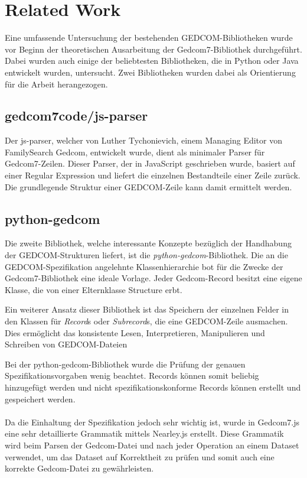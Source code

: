\chapter{Related Work}
\label{chap: Related Work}
Eine umfassende Untersuchung der bestehenden GEDCOM-Bibliotheken wurde vor Beginn der theoretischen Ausarbeitung der Gedcom7-Bibliothek durchgeführt. 
Dabei wurden auch einige der beliebtesten Bibliotheken, die in Python oder Java entwickelt wurden, untersucht. Zwei Bibliotheken wurden dabei als Orientierung 
für die Arbeit herangezogen.

\section{gedcom7code/js-parser}

Der js-parser, welcher von Luther Tychonievich, einem Managing Editor von FamilySearch Gedcom, entwickelt wurde, dient als minimaler Parser für Gedcom7-Zeilen. 
Dieser Parser, der in JavaScript geschrieben wurde, basiert auf einer Regular Expression und liefert die einzelnen Bestandteile einer Zeile zurück. Die grundlegende 
Struktur einer GEDCOM-Zeile kann damit ermittelt werden.

\section{python-gedcom}

Die zweite Bibliothek, welche interessante Konzepte bezüglich der Handhabung der GEDCOM-Strukturen liefert, ist die \textit{python-gedcom}-Bibliothek. 
Die an die GEDCOM-Spezifikation angelehnte Klassenhierarchie bot für die Zwecke der Gedcom7-Bibliothek eine ideale Vorlage. Jeder Gedcom-Record besitzt eine eigene Klasse, 
die von einer Elternklasse Structure erbt.

Ein weiterer Ansatz dieser Bibliothek ist das Speichern der einzelnen Felder in den Klassen für \textit{Record}s oder \textit{Subrecord}s, die eine GEDCOM-Zeile ausmachen. 
Dies ermöglicht das konsistente Lesen, Interpretieren, Manipulieren und Schreiben von GEDCOM-Dateien

Bei der python-gedcom-Bibliothek wurde die Prüfung der genauen Spezifikationsvorgaben wenig beachtet. Records können somit beliebig
hinzugefügt werden und nicht spezifikationskonforme Records können erstellt und gespeichert werden.
\\\\
Da die Einhaltung der Spezifikation jedoch sehr wichtig ist, wurde in Gedcom7.js eine sehr detaillierte Grammatik mittels Nearley.js erstellt. Diese Grammatik wird
beim Parsen der Gedcom-Datei und nach jeder Operation an einem Dataset verwendet, um das Dataset auf Korrektheit zu prüfen und somit auch eine korrekte Gedcom-Datei
zu gewährleisten.